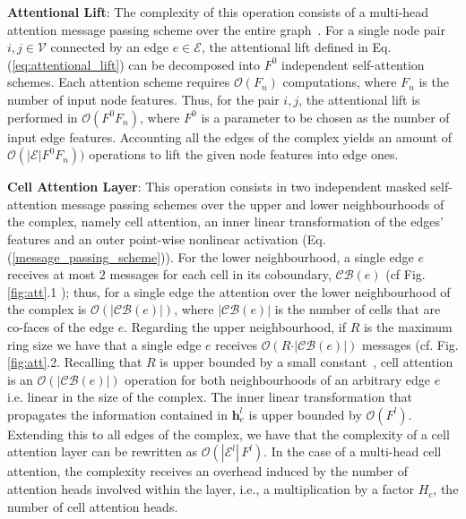 \documentclass{article}
\begin{document}
\textbf{Attentional Lift}: The complexity of this operation consists of a multi-head attention message passing scheme over the entire graph~\cite{velivckovic2017graph}. For a single node pair $i,j \in \mathcal{V}$ connected by an edge $e \in \mathcal{E}$, the attentional lift defined in Eq. (\ref{eq:attentional_lift}) can be decomposed into $F^0$ independent self-attention schemes. Each attention scheme requires $\mathcal{O}(F_n)$ computations, where $F_n$ is the number of input node features. Thus, for the pair $i,j$, the attentional lift is performed in $\mathcal{O}(F^0 F_n)$, where $F^0$ is a parameter to be chosen as the number of input edge features. Accounting all the edges of the complex yields an amount of $\mathcal{O}(\vert \mathcal{E} \vert F^0 F_n))$ operations to lift the given node features into edge ones.

\textbf{Cell Attention Layer}: This operation consists in two independent masked self-attention message passing schemes over the upper and lower neighbourhoods of the complex, namely cell attention, an inner linear transformation of the edges' features and an outer point-wise nonlinear activation (Eq.(\ref{message_passing_scheme})). For the lower neighbourhood, a single edge $e$ receives at most $2$ messages for each cell in its coboundary, $\mathcal{CB}(e)$ (cf Fig. \ref{fig:att}.1 ); thus, for a single edge the attention over the lower neighbourhood of the complex is $\mathcal{O}(\vert \mathcal{CB}(e) \vert)$, where $\vert \mathcal{CB}(e) \vert$ is the number of cells that are co-faces of the edge $e$. Regarding the upper neighbourhood, if $R$ is the maximum ring size we have that a single edge $e$ receives $\mathcal{O}(R \cdot \vert \mathcal{CB}(e) \vert)$ messages (cf. Fig. \ref{fig:att}.2. Recalling that $R$ is upper bounded by a small constant~\cite{bodnarcwnet}, cell attention is an $\mathcal{O}(\vert \mathcal{CB}(e) \vert)$ operation for both neighbourhoods of an arbitrary edge $e$ i.e. linear in the size of the complex. The inner linear transformation that propagates the information contained in $\mathbf{h}^{l}_e$ is upper bounded by $\mathcal{O}(F^{l})$. Extending this to all edges of the complex, we have that the complexity of a cell attention layer can be rewritten as $\mathcal{O}(|\mathcal{E}^l|\, F^{l})$. In the case of a multi-head cell attention, the complexity receives an overhead induced by the number of attention heads involved within the layer, i.e., a multiplication by a factor $H_c$, the number of cell attention heads.
 
\end{document}
